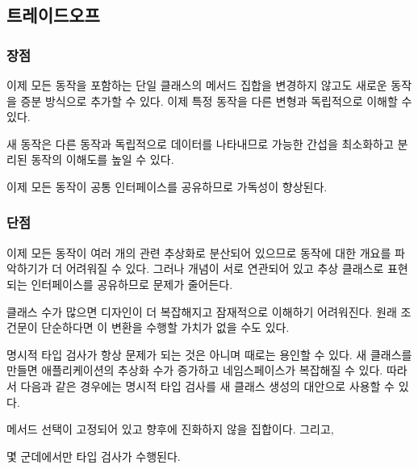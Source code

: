 \documentclass[a4paper,10pt,twoside]{book}
\begin{document}
\subsection*{트레이드오프}

\subsubsection*{장점}

\begin{bulletlist}
\item 이제 모든 동작을 포함하는 단일 클래스의 메서드 집합을 변경하지 않고도 새로운 동작을 증분 방식으로 추가할 수 있다. 이제 특정 동작을 다른 변형과 독립적으로 이해할 수 있다. 

\item 새 동작은 다른 동작과 독립적으로 데이터를 나타내므로 가능한 간섭을 최소화하고 분리된 동작의 이해도를 높일 수 있다. 

\item 이제 모든 동작이 공통 인터페이스를 공유하므로 가독성이 향상된다.
\end{bulletlist}

\subsubsection*{단점}

\begin{bulletlist}
\item 이제 모든 동작이 여러 개의 관련 추상화로 분산되어 있으므로 동작에 대한 개요를 파악하기가 더 어려워질 수 있다. 그러나 개념이 서로 연관되어 있고 추상 클래스로 표현되는 인터페이스를 공유하므로 문제가 줄어든다. 

\item 클래스 수가 많으면 디자인이 더 복잡해지고 잠재적으로 이해하기 어려워진다. 원래 조건문이 단순하다면 이 변환을 수행할 가치가 없을 수도 있다.

\item 명시적 타입 검사가 항상 문제가 되는 것은 아니며 때로는 용인할 수 있다. 새 클래스를 만들면 애플리케이션의 추상화 수가 증가하고 네임스페이스가 복잡해질 수 있다. 따라서 다음과 같은 경우에는 명시적 타입 검사를 새 클래스 생성의 대안으로 사용할 수 있다.
	\begin{bulletlist}
	\item 메서드 선택이 고정되어 있고 향후에 진화하지 않을 집합이다. 그리고, 
	\item 몇 군데에서만 타입 검사가 수행된다.
	\end{bulletlist}
\end{bulletlist}
\end{document}
